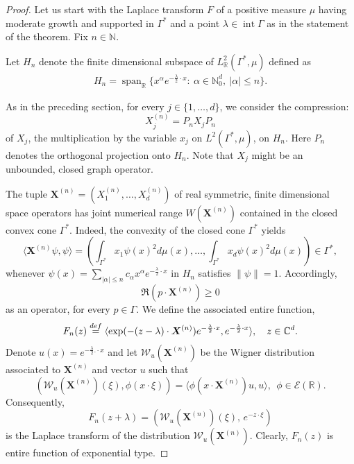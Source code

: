 \documentclass[10pt,a4paper]{amsart}
\newcommand{\bydef}{\stackrel{\rm def}{=}}
\begin{document}
\begin{proof}
Let us start with the Laplace transform $F$ of a positive measure $\mu$ having moderate growth and supported in $\Gamma^*$ and a point $\lambda \in \operatorname{int} \Gamma$ as in the statement of the theorem. Fix $n\in \mathbb{N}$.

	Let $H_n$ denote the finite dimensional subspace of $L_{\mathbb{R}}^2(\Gamma^*, \mu)$ defined as
    \begin{align*}
        H_n= \operatorname{span}_\mathbb{R} \{x^\alpha e^{-\frac{\lambda}{2} \cdot x} : \ \alpha \in \mathbb{N}_0^d, \ |\alpha| \leq n\}.
        \end{align*}
    
    As in the preceding section, for every $j \in \{1, \dots, d\}$, we consider the compression: 
    $$
    X^{(n)}_j = P_n X_j P_n
    $$ 
    of $X_j$, the multiplication by the variable $x_j$ on $L^2(\Gamma^*, \mu)$, on $H_n$. Here $P_n$ denotes the orthogonal projection onto $H_n$. Note that $X_j$ might be an unbounded, closed graph operator.
	
	The tuple $\boldsymbol{X}^{(n)} = (X^{(n)}_1, \dots, X^{(n)}_d)$ of real symmetric, finite dimensional space operators has joint numerical range $W(\boldsymbol{X}^{(n)})$ contained in the closed convex cone $\Gamma^\ast$. Indeed, the convexity of the closed  cone $\Gamma^\ast$ yields
	$$ \langle \boldsymbol{X}^{(n)} \psi, \psi \rangle =\left(\int_{\Gamma^\ast} x_1 \psi(x)^2 d\mu(x), \ldots, \int_{\Gamma^\ast} x_d \psi(x)^2 d\mu(x) \right) \in \Gamma^\ast,$$
	whenever $\psi(x) = \sum_{|\alpha| \leq n} c_\alpha x^\alpha e^{-\frac{\lambda}{2} \cdot x}$ in $H_n$ satisfies 
	$ \|\psi\| = 1.$
	Accordingly,
	$$ \Re (p\cdot \boldsymbol{X}^{(n)}) \geq 0$$ as an operator, for every $ p \in \Gamma$. 
We define the associated entire function,
	$$ F_n(z) \bydef \langle \exp (- (z- \lambda) \cdot \boldsymbol{X}^{(n)}) e^{-\frac{\lambda}{2} \cdot x}, e^{-\frac{\lambda}{2} \cdot x} \rangle, \quad z\in \mathbb{C}^d.$$
	Denote $u(x) =  e^{-\frac{\lambda}{2} .\cdot x}$ and let ${\mathcal W}_u(\boldsymbol{X}^{(n)})$ be the Wigner distribution associated to $\boldsymbol{X}^{(n)}$ and vector $u$ such that
	$$( {\mathcal W}_u(\boldsymbol{X}^{(n)})(\xi), \phi(x \cdot \xi)) = \langle \phi( x\cdot \boldsymbol{X}^{(n)}) u, u\rangle, \ \ \phi \in {\mathcal E}({\mathbb R}).$$
	Consequently, 
	$$ F_n(z + \lambda) = ({\mathcal W}_u(\boldsymbol{X}^{(n)})(\xi),\,  e^{-z \cdot \xi})$$
	is the Laplace transform of the distribution ${\mathcal W}_u(\boldsymbol{X}^{(n)})$. Clearly, $F_n(z)$ is entire function of exponential type. 


\end{proof}
\end{document}
